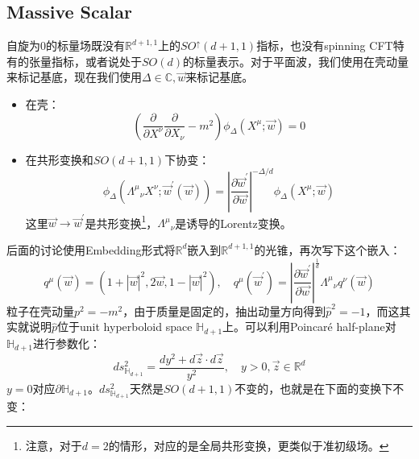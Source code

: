\subsection{Massive Scalar}
\begin{definition}
自旋为$0$的标量场既没有$\mathbb{R}^{d+1,1}$上的$SO^\uparrow(d+1,1)$指标，也没有spinning CFT特有的张量指标，或者说处于$SO(d)$的标量表示。对于平面波，我们使用在壳动量来标记基底，现在我们使用$\Delta\in\mathbb{C},\vec{w}$来标记基底。
\begin{itemize}
	\item 在壳：
	\begin{equation}
		\left(\frac{\partial}{\partial X^{\nu}} \frac{\partial}{\partial X_{\nu}}-m^{2}\right) \phi_{\Delta}\left(X^{\mu} ; \vec{w}\right)=0
	\end{equation}
	\item 在共形变换和$SO(d+1,1)$下协变：
	\begin{equation}
		\phi_{\Delta}\left({\Lambda^{\mu}}_{\nu} X^{\nu} ; \vec{w}^{\prime}(\vec{w})\right)=\left|\frac{\partial \vec{w}^{\prime}}{\partial \vec{w}}\right|^{-\Delta / d} \phi_{\Delta}\left(X^{\mu} ; \vec{w}\right)
	\end{equation}
	这里$\vec{w}\to\vec{w}^\prime$是共形变换\footnote{注意，对于$d=2$的情形，对应的是全局共形变换，更类似于准初级场。}，${\Lambda^\mu}_\nu$是诱导的Lorentz变换。
\end{itemize}
\end{definition}
后面的讨论使用Embedding形式将$\mathbb{R}^{d}$嵌入到$\mathbb{R}^{d+1,1}$的光锥，再次写下这个嵌入：
\begin{equation}
	q^\mu(\vec{w})=\left(1+|\vec{w}|^2,2\vec{w},1-|\vec{w}|^2\right),\quad q^\mu(\vec{w}^\prime)=\left|\frac{\partial \vec{w}^\prime}{\partial\vec{w}}\right|^{\frac{1}{d}}{\Lambda^\mu}_\nu q^\nu(\vec{w})
\end{equation}
粒子在壳动量$p^2=-m^2$，由于质量是固定的，抽出动量方向得到$\hat p^2=-1$，而这其实就说明$\hat p$位于unit hyperboloid space $\mathbb{H}_{d+1}$上。可以利用Poincar\'e half-plane对$\mathbb{H}_{d+1}$进行参数化：
\begin{equation}
	ds^2_{\mathbb{H}_{d+1}}=\frac{dy^2+d\vec{z}\cdot d\vec{z}}{y^2},\quad y>0,\vec{z}\in\mathbb{R}^d
\end{equation}
$y=0$对应$\partial\mathbb{H}_{d+1}$。$ds^2_{\mathbb{H}_{d+1}}$天然是$SO(d+1,1)$不变的，也就是在下面的变换下不变：
